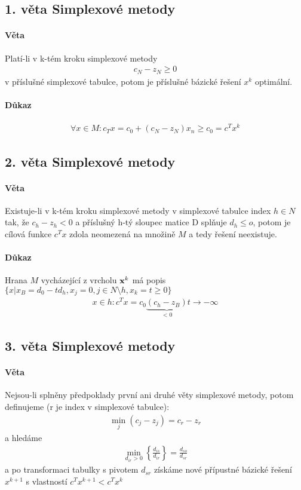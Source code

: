 \documentclass[a4paper,12pt,titlepage]{article}
\begin{document}
\subsection{1. věta Simplexové metody}
\setcounter{equation}{0}
\paragraph{Věta}
Platí-li v k-tém kroku simplexové metody
\begin{align}
	c_N - z_N \ge 0
\end{align}
v příslušné simplexové tabulce, potom je příslušné bázické řešení $x^k$
optimální.
\paragraph{Důkaz}
\begin{align}
	\forall x \in M : c_Tx = c_0 + (c_N - z_N) x_n \ge c_0 = c^Tx^k
\end{align}

\subsection{2. věta Simplexové metody}
\setcounter{equation}{0}
\paragraph{Věta}
Existuje-li v k-tém kroku simplexové metody v simplexové tabulce index $h \in N$
tak, že $c_h - z_h < 0$ a příslušný h-tý sloupec matice D splňuje $d_h \le o$,
potom je cílová funkce $c^Tx$ zdola neomezená na množině $M$ a tedy řešení
neexistuje.
\paragraph{Důkaz}
Hrana $M$ vycházející z vrcholu $\mathbf{x}^k$ má popis $\{ x | x_B = d_0 - td_h, x_j = 0,
j \in N \setminus h, x_k = t \ge 0\}$
\begin{align}
	x\in h: c^Tx = c_0 \underbrace{(c_h-z_B)}_{<0} t \to -\infty
\end{align}

\subsection{3. věta Simplexové metody}
\setcounter{equation}{0}
\paragraph{Věta}
Nejsou-li splněny předpoklady první ani druhé věty simplexové metody, potom
definujeme (r je index v simplexové tabulce):
\begin{align}
	\min_j (c_j - z_j) = c_r - z_r
\end{align}
a hledáme
\begin{align}
	\label{simplex-minimum}
	\min_{d_{ir} > 0} \left\{ \frac{d_{is}}{d_{ir}} \right\} = \frac{d_{so}}{d_{sr}}
\end{align}
a po transformaci tabulky s pivotem $d_{sr}$ získáme nové přípustné bázické řešení
$x^{k+1}$ s vlastností $c^Tx^{k+1} < c^T x^k$
\end{document}
